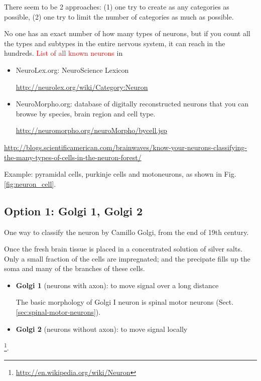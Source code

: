 There seem to be 2 approaches: (1) one try to create as any categories as
possible, (2) one try to limit the number of categories as much as possible.


No one has an exact number of how many types of neurons, but if
you count all the types and subtypes in the entire nervous system, it can reach
in the hundreds.
 \textcolor{red}{List of all known neurons} in
\begin{itemize}
  \item  NeuroLex.org: NeuroScience Lexicon
  
\url{http://neurolex.org/wiki/Category:Neuron}

  \item NeuroMorpho.org:
   database of digitally reconstructed neurons that you can browse by species,
  brain region and cell type.
  
  \url{http://neuromorpho.org/neuroMorpho/bycell.jsp}
  
  
\end{itemize} 
\url{http://blogs.scientificamerican.com/brainwaves/know-your-neurons-classifying-the-many-types-of-cells-in-the-neuron-forest/}

Example: pyramidal cells, purkinje cells and motoneurons, as shown in
Fig.\ref{fig:neuron_cell}. 


\subsection{Option 1: Golgi 1, Golgi 2}
\label{sec:neuron-classify-Golgi-1-2}
\label{sec:Golgi-I-neurons}
\label{sec:Golgi-II-neurons}

One way to classify the neuron by Camillo Golgi, from the end of 19th century.
 
Once the fresh brain tissue is placed in a concentrated solution of silver
salts. Only a small fraction of the cells are impregnated; and the precipate
fills up the soma and many of the branches of these cells.


\begin{itemize}
  \item  {\bf Golgi 1} (neurons with axon): to move signal over a long distance 
  
  The basic morphology of Golgi I neuron is spinal motor neurons
  (Sect.\ref{sec:spinal-motor-neurons}).
  
  \item {\bf Golgi 2} (neurons without axon): to move signal locally
\end{itemize}
\footnote{\url{http://en.wikipedia.org/wiki/Neuron}}.

